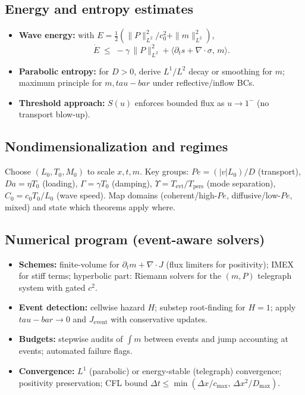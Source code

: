 \documentclass[12pt]{article}
\newcommand{\FoldTime}{\bar{\tau}}
\newcommand{\Survival}{S}
\def\FoldTime{tau-bar}%
\def\Survival{S}%
\def\bar#1{#1}%
\def\mathrm#1{#1}%
\begin{document}
\subsection{Energy and entropy estimates}
\begin{itemize}
  \item \textbf{Wave energy:} with $E=\tfrac12\!\left(\|P\|_{L^2}^2/c_0^2+\|m\|_{L^2}^2\right)$,
  \[
  \dot E \;\le\; -\gamma\,\|P\|_{L^2}^2 + \langle \partial_t s+\nabla\!\cdot\sigma,\, m\rangle.
  \]
  \item \textbf{Parabolic entropy:} for $D>0$, derive $L^1/L^2$ decay or smoothing for $m$; maximum principle for $m,\FoldTime$ under reflective/inflow BCs.
  \item \textbf{Threshold approach:} $\Survival(u)$ enforces bounded flux as $u\to 1^-$ (no transport blow-up).
\end{itemize}

\subsection{Nondimensionalization and regimes}
Choose $(L_0,T_0,M_0)$ to scale $x,t,m$. Key groups: $\mathrm{Pe}=(|v|L_0)/D$ (transport), $\mathrm{Da}=\eta T_0$ (loading), $\Gamma=\gamma T_0$ (damping), $\Upsilon = T_{\text{evt}}/T_{\text{pers}}$ (mode separation), $C_0=c_0 T_0/L_0$ (wave speed). Map domains (coherent/high-$\mathrm{Pe}$, diffusive/low-$\mathrm{Pe}$, mixed) and state which theorems apply where.

\subsection{Numerical program (event-aware solvers)}
\begin{itemize}
  \item \textbf{Schemes:} finite-volume for $\partial_t m+\nabla\!\cdot J$ (flux limiters for positivity); IMEX for stiff terms; hyperbolic part: Riemann solvers for the $(m,P)$ telegraph system with gated $c^2$.
  \item \textbf{Event detection:} cellwise hazard $H$; substep root-finding for $H=1$; apply $\FoldTime\to 0$ and $J_{\text{event}}$ with conservative updates.
  \item \textbf{Budgets:} stepwise audits of $\int m$ between events and jump accounting at events; automated failure flags.
  \item \textbf{Convergence:} $L^1$ (parabolic) or energy-stable (telegraph) convergence; positivity preservation; CFL bound $\Delta t \le \min(\Delta x/c_{\max},\, \Delta x^2/D_{\max})$.
\end{itemize}
\end{document}
